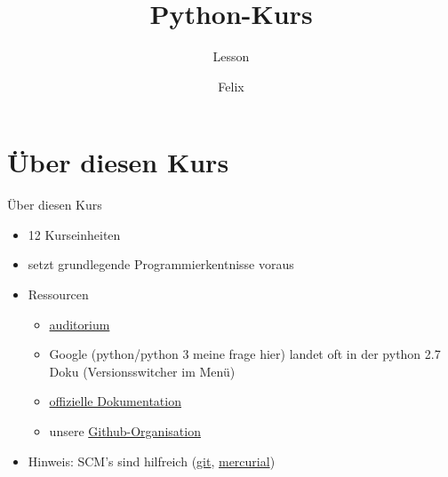 \documentclass[]{tudbeamer}
\title{Python-Kurs}
\subtitle{Lesson}
\author{Felix}
\begin{document}
\maketitle

\begin{frame}
\tableofcontents
\end{frame}

\section{Über diesen Kurs}
\begin{frame}{Über diesen Kurs}
	\begin{itemize}
    	\item 12 Kurseinheiten
    	\item setzt grundlegende Programmierkentnisse voraus
    	\item Ressourcen
    	\begin{itemize}
    	    \item \href{http://auditorium.inf.tu-dresden.de}{auditorium} %
	        \item Google (python/python 3 meine frage hier) landet oft in der python 2.7 Doku (Versionsswitcher im Menü)
    	    \item \href{docs.python.org}{offizielle Dokumentation}
    	    \item unsere \href{https://github.com/fsr}{Github-Organisation}
    	\end{itemize}
    	\item Hinweis: SCM's sind hilfreich (\href{https://git-scm.com}{git}, \href{http://mercurial.selenic.com/}{mercurial})
	\end{itemize}
\end{frame}

\end{document}
